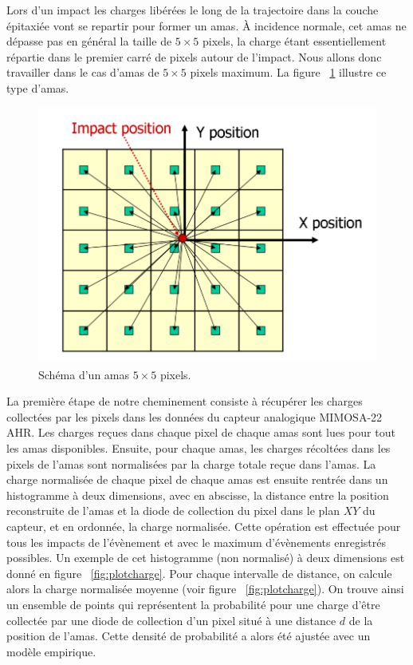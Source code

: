   \medskip
   
   Lors d'un impact les charges lib\'er\'ees le long de la trajectoire dans la couche \'epitaxi\'ee vont se repartir pour former un amas. \`A incidence normale, cet amas ne d\'epasse pas en g\'en\'eral la taille de $5 \times 5$ pixels, la charge \'etant essentiellement r\'epartie dans le premier carr\'e de pixels autour de l'impact. Nous allons donc travailler dans le cas d'amas de $5 \times 5$ pixels maximum. La figure ~\ref{fig:cl5x5} illustre ce type d'amas. 
   

   \begin{figure}[!htb]
    \begin{center} 
     \includegraphics[scale=0.30]{./figures/5x5_cluster.png}
     \caption{Sch\'ema d'un amas $5 \times 5$ pixels.}
     \label{fig:cl5x5}
   \end{center}
   \end{figure}

   \medskip
   
   La premi\`ere \'etape de notre cheminement consiste \`a r\'ecup\'erer les charges collect\'ees par les pixels dans les donn\'ees du capteur analogique MIMOSA-22 AHR. Les charges re\c{c}ues dans chaque pixel de chaque amas sont lues pour tout les amas disponibles. Ensuite, pour chaque amas, les charges r\'ecolt\'ees dans les pixels de l'amas sont normalis\'ees par la charge totale reçue dans l'amas. La charge normalis\'ee de chaque pixel de chaque amas est ensuite rentr\'ee dans un histogramme \`a deux dimensions, avec en abscisse, la distance entre la position reconstruite de l'amas et la diode de collection du pixel dans le plan $XY$ du capteur, et en ordonn\'ee, la charge normalis\'ee. Cette op\'eration est effectu\'ee pour tous les impacts de l'\'ev\`enement et avec le maximum d'\'ev\`enements enregistr\'es possibles. Un exemple de cet histogramme (non normalis\'e) \`a deux dimensions est donn\'e en figure ~\ref{fig:plotcharge}. Pour chaque intervalle de distance, on calcule alors la charge normalis\'ee moyenne (voir figure ~\ref{fig:plotcharge}). On trouve ainsi un ensemble de points qui repr\'esentent la probabilit\'e pour une charge d'\^etre collect\'ee par une diode de collection d'un pixel situ\'e \`a une distance $d$ de la position de l'amas. Cette densit\'e de probabilit\'e a alors \'et\'e ajust\'ee avec un mod\`ele empirique.
   
